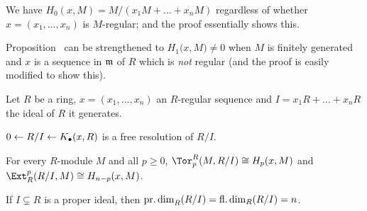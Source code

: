 \documentclass[a4paper,parskip=half,numbers=enddot, DIV=12]{scrreprt}
\begin{document}
\begin{rem*}
	\begin{alphanumerate}
		\item We have $H_0(x,M)=M/(x_1M+\ldots+x_nM)$ regardless of whether $x=(x_1,\ldots,x_n)$ is $M$-regular; and the proof essentially shows this.
		\item Proposition~ can be strengthened to $H_1\big(x,M\big)\neq 0$ when $M$ is finitely generated and $x$ is a sequence in $\mathfrak{m}$ of $R$ which is \emph{not} regular (and the proof is easily modified to show this).
	\end{alphanumerate}
\end{rem*}
\begin{fact}
	Let $R$ be a ring, $x=(x_1,\ldots,x_n)$ an $R$-regular sequence and $I=x_1R+\ldots+x_nR$ the ideal of $R$ it generates.
	\begin{alphanumerate}
		\item $0\lmorphism R/I\lmorphism K_\bullet(x,R)$ is a free resolution of $R/I$.
		\item For every $R$-module $M$ and all $p\geq 0$, $\Tor_p^R(M,R/I)\cong H_p(x,M)$ and  $\Ext_R^p(R/I,M)\cong H_{n-p}(x,M)$.
		\item If $I\subsetneq R$ is a proper ideal, then $\operatorname{pr.dim}_R(R/I)=\operatorname{fl.dim}_R(R/I)= n$.
	\end{alphanumerate}
\end{fact}
\end{document}
